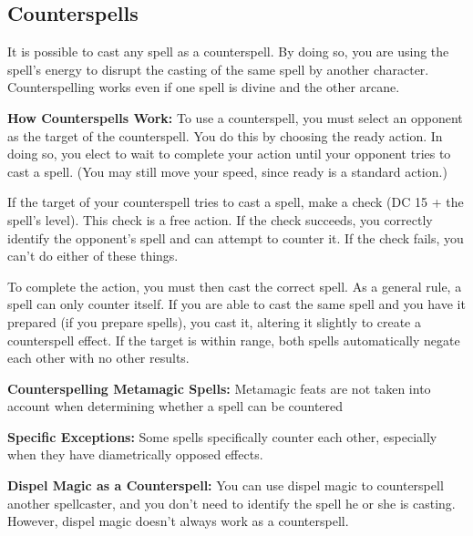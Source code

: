 \subsection{Counterspells}
It is possible to cast any spell as a counterspell. By doing so, you are using the spell's energy to disrupt the casting of the same spell by another character. Counterspelling works even if one spell is divine and the other arcane.

\textbf{How Counterspells Work:} To use a counterspell, you must select an opponent as the target of the counterspell. You do this by choosing the ready action. In doing so, you elect to wait to complete your action until your opponent tries to cast a spell. (You may still move your speed, since ready is a standard action.)

If the target of your counterspell tries to cast a spell, make a  check (DC 15 + the spell's level). This check is a free action. If the check succeeds, you correctly identify the opponent's spell and can attempt to counter it. If the check fails, you can't do either of these things.

To complete the action, you must then cast the correct spell. As a general rule, a spell can only counter itself. If you are able to cast the same spell and you have it prepared (if you prepare spells), you cast it, altering it slightly to create a counterspell effect. If the target is within range, both spells automatically negate each other with no other results.

\textbf{Counterspelling Metamagic Spells:} Metamagic feats are not taken into account when determining whether a spell can be countered

\textbf{Specific Exceptions:} Some spells specifically counter each other, especially when they have diametrically opposed effects.

\textbf{Dispel Magic as a Counterspell:} You can use dispel magic to counterspell another spellcaster, and you don't need to identify the spell he or she is casting. However, dispel magic doesn't always work as a counterspell.